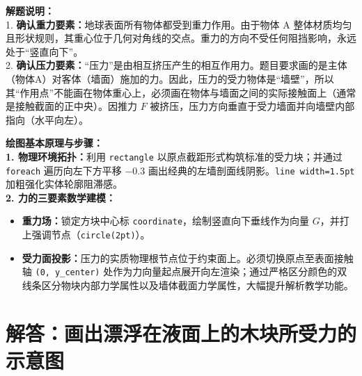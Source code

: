 \vspace{0.6cm}

{\small\color{gray}
\textbf{解题说明：}\\
1. \textbf{确认重力要素：}地球表面所有物体都受到重力作用。由于物体 A 整体材质均匀且形状规则，其重心位于几何对角线的交点。重力的方向不受任何阻挡影响，永远处于“竖直向下”。\\
2. \textbf{确认压力要素：}“压力”是由相互挤压产生的相互作用力。题目要求画的是主体（物体A）对客体（墙面）施加的力。因此，压力的受力物体是“墙壁”，所以其“作用点”不能画在物体重心上，必须画在物体与墙面之间的实际接触面上（通常是接触截面的正中央）。因推力 $F$ 被挤压，压力方向垂直于受力墙面并向墙壁内部指向（水平向左）。
}

\vspace{0.6cm}

{\small\color{blue!70!black}
\textbf{绘图基本原理与步骤：}\\
\textbf{1. 物理环境拓扑：}利用 \texttt{rectangle} 以原点截距形式构筑标准的受力块；并通过 \texttt{foreach} 遍历向左下方平移 $-0.3$ 画出经典的左墙剖面线阴影。\texttt{line width=1.5pt} 加粗强化实体轮廓阻滞感。\\
\textbf{2. 力的三要素数学建模：}
\begin{itemize}
    \item \textbf{重力场：}锁定方块中心标 \texttt{coordinate}，绘制竖直向下垂线作为向量 $G$，并打上强调节点（\texttt{circle(2pt)}）。
    \item \textbf{受力面投影：}压力的实质物理根节点位于约束面上。必须切换原点至表面接触轴 \texttt{(0, y\_center)} 处作为力向量起点展开向左渲染；通过严格区分颜色的双线条区分物块内部力学属性以及墙体截面力学属性，大幅提升解析教学功能。
\end{itemize}
}




\section{解答：画出漂浮在液面上的木块所受力的示意图}

\vspace{0.6cm}

